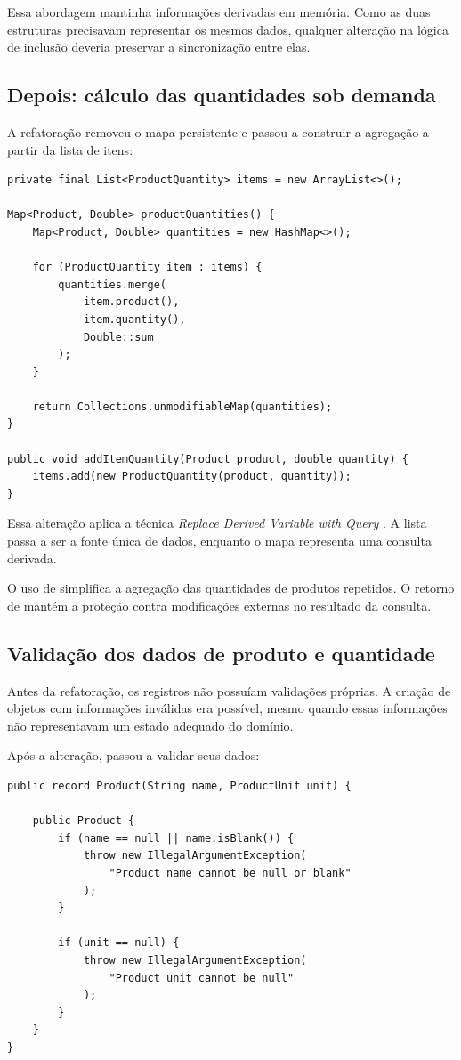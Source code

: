 Essa abordagem mantinha informações derivadas em memória. Como as duas estruturas precisavam representar os mesmos dados, qualquer alteração na lógica de inclusão deveria preservar a sincronização entre elas.

\subsection{Depois: cálculo das quantidades sob demanda}

A refatoração removeu o mapa persistente e passou a construir a agregação a partir da lista de itens:

\begin{lstlisting}
private final List<ProductQuantity> items = new ArrayList<>();

Map<Product, Double> productQuantities() {
    Map<Product, Double> quantities = new HashMap<>();

    for (ProductQuantity item : items) {
        quantities.merge(
            item.product(),
            item.quantity(),
            Double::sum
        );
    }

    return Collections.unmodifiableMap(quantities);
}

public void addItemQuantity(Product product, double quantity) {
    items.add(new ProductQuantity(product, quantity));
}
\end{lstlisting}

Essa alteração aplica a técnica \textit{Replace Derived Variable with Query} \cite{fowler2020}. A lista passa a ser a fonte única de dados, enquanto o mapa representa uma consulta derivada.

O uso de  simplifica a agregação das quantidades de produtos repetidos. O retorno de  mantém a proteção contra modificações externas no resultado da consulta.

\subsection{Validação dos dados de produto e quantidade}

Antes da refatoração, os registros não possuíam validações próprias. A criação de objetos com informações inválidas era possível, mesmo quando essas informações não representavam um estado adequado do domínio.

Após a alteração,  passou a validar seus dados:

\begin{lstlisting}
public record Product(String name, ProductUnit unit) {

    public Product {
        if (name == null || name.isBlank()) {
            throw new IllegalArgumentException(
                "Product name cannot be null or blank"
            );
        }

        if (unit == null) {
            throw new IllegalArgumentException(
                "Product unit cannot be null"
            );
        }
    }
}
\end{lstlisting}

